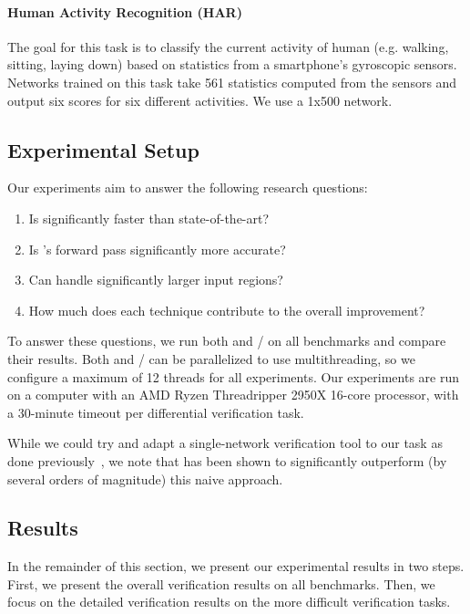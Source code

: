 \paragraph{Human Activity Recognition (HAR)~\cite{AnguitaHAR}}
The goal for this task is to classify
the current activity of human (e.g. walking, sitting, laying down) based
on statistics from a smartphone's gyroscopic sensors. Networks trained
on this task take 561 statistics computed from the sensors and output six
scores for six different activities. We use a 1x500 network.

\subsection{Experimental Setup}

Our experiments aim to answer the following research questions:

\begin{enumerate}
	\item Is \Name{} significantly faster than state-of-the-art?
	\item Is \Name{}'s forward pass significantly more accurate?
	\item Can \Name{} handle significantly larger input regions?
	\item How much does each technique contribute to the overall improvement?
\end{enumerate}

To answer these questions, we run both \Name{}
and \ReluDiff{}/\ReluDiffP{} on all benchmarks and compare their
results.  Both \Name{} and \ReluDiff{}/\ReluDiffP{} can be
parallelized to use multithreading, so we configure a maximum of 12
threads for all experiments.  Our experiments are run on a computer
with an AMD Ryzen Threadripper 2950X 16-core processor, with a
30-minute timeout per differential verification task.


While we could try and adapt a single-network verification tool to our
task as done previously~\cite{paulsen2020reludiff}, we note that \ReluDiff{}
has been shown to significantly outperform (by several orders of
magnitude) this naive approach.



\subsection{Results}

In the remainder of this section, we present our experimental results
in two steps.  First, we present the overall verification results on
all benchmarks. Then, we focus on the detailed verification results on
the more difficult verification tasks.



